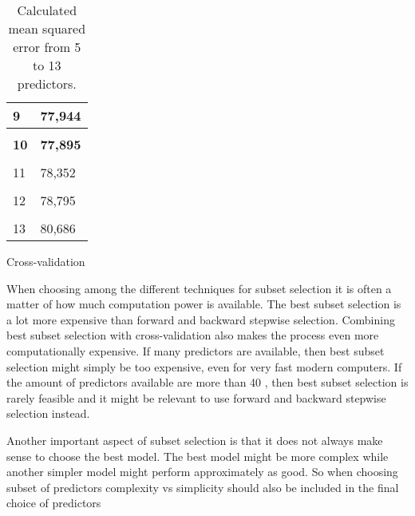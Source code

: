 \begin{table}
\begin{subtable}[t]{2in}
\begin{tabular}{ p{2.5cm} p{1.5cm}  }
		9 & 77,944  \\\hline
		\\
		\textbf{10} & \textbf{77,895} \\\hline
		\\
		11 & 78,352  \\\hline
		\\
		12 & 78,795 \\\hline
		\\
		13 & 80,686 \\\hline
	\end{tabular}
		\caption{Cross-validation}\label{table:mse_cross}
	\end{subtable}
	\caption{Calculated mean squared error from 5 to 13 predictors.}\label{table:mse}
\end{table}

When choosing among the different techniques for subset selection it is often a matter of how much computation power is available.  The best subset selection is a lot more expensive than forward and backward stepwise selection. Combining best subset selection with cross-validation also makes the process even more computationally expensive. If many predictors are available, then best subset selection might simply be too expensive, even for very fast modern computers. If the amount of predictors available are more than 40 \citep[pp. 207]{ISLR}, then best subset selection is rarely feasible and it might be relevant to use forward and backward stepwise selection instead. 

Another important aspect of subset selection is that it does not always make sense to choose the best model. The best model might be more complex while another simpler model might perform approximately as good. So when choosing subset of predictors complexity vs simplicity should also be included in the final choice of predictors
